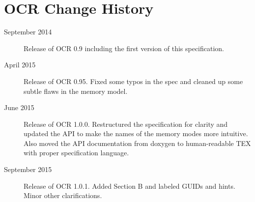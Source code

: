 %

\chapter{OCR Change  History}
\label{chap:OCR Change History}
\label{chap:Appendix D}
\begin{description}
\item[September 2014] Release of OCR 0.9 including the first version
  of this specification.
\item[April 2015] Release of OCR 0.95.  Fixed some typos in the spec and
cleaned up some subtle flaws in the memory model.
\item[June 2015] Release of OCR 1.0.0. Restructured the specification for clarity and
updated the API to make the names of the memory modes more intuitive. Also moved
the API documentation from doxygen to human-readable TEX with proper specification
language.
\item[September 2015] Release of OCR 1.0.1. Added Section B and labeled GUIDs and
hints. Minor other clarifications.
\end{description}

